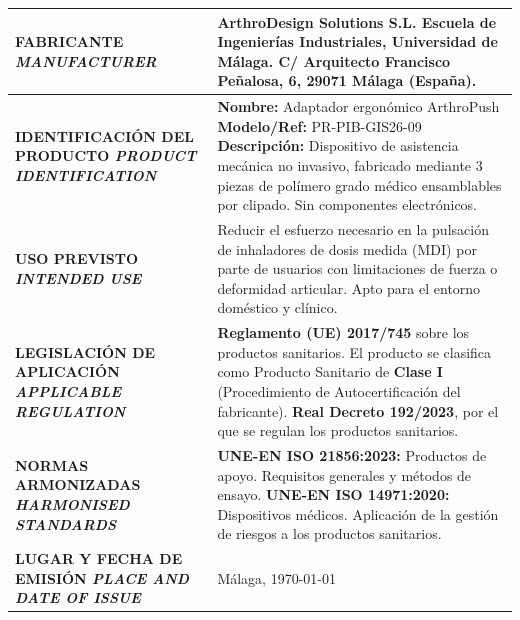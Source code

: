 \documentclass[11pt,a4paper]{article}
\begin{document}
\noindent
{\renewcommand{\arraystretch}{2}
\begin{tabularx}{\textwidth}{|>{\columncolor{gray!15}\bfseries\small}p{4.5cm}|X|}
\hline
FABRICANTE \newline \textit{MANUFACTURER} & \textbf{ArthroDesign Solutions S.L.} \newline Escuela de Ingenierías Industriales, Universidad de Málaga. \newline C/ Arquitecto Francisco Peñalosa, 6, 29071 Málaga (España). \\
\hline
IDENTIFICACIÓN DEL PRODUCTO \newline \textit{PRODUCT IDENTIFICATION} & \textbf{Nombre:} Adaptador ergonómico ArthroPush \newline \textbf{Modelo/Ref:} PR-PIB-GIS26-09 \newline \textbf{Descripción:} Dispositivo de asistencia mecánica no invasivo, fabricado mediante 3 piezas de polímero grado médico ensamblables por clipado. Sin componentes electrónicos. \\
\hline
USO PREVISTO \newline \textit{INTENDED USE} & Reducir el esfuerzo necesario en la pulsación de inhaladores de dosis medida (MDI) por parte de usuarios con limitaciones de fuerza o deformidad articular. Apto para el entorno doméstico y clínico. \\
\hline
LEGISLACIÓN DE APLICACIÓN \newline \textit{APPLICABLE REGULATION} & \textbf{Reglamento (UE) 2017/745} sobre los productos sanitarios. El producto se clasifica como Producto Sanitario de \textbf{Clase I} (Procedimiento de Autocertificación del fabricante). \newline \textbf{Real Decreto 192/2023}, por el que se regulan los productos sanitarios. \\
\hline
NORMAS ARMONIZADAS \newline \textit{HARMONISED STANDARDS} & \textbf{UNE-EN ISO 21856:2023:} Productos de apoyo. Requisitos generales y métodos de ensayo. \newline \textbf{UNE-EN ISO 14971:2020:} Dispositivos médicos. Aplicación de la gestión de riesgos a los productos sanitarios. \\
\hline
LUGAR Y FECHA DE EMISIÓN \newline \textit{PLACE AND DATE OF ISSUE} & Málaga, \today \\
\hline
\end{tabularx}}
\end{document}
